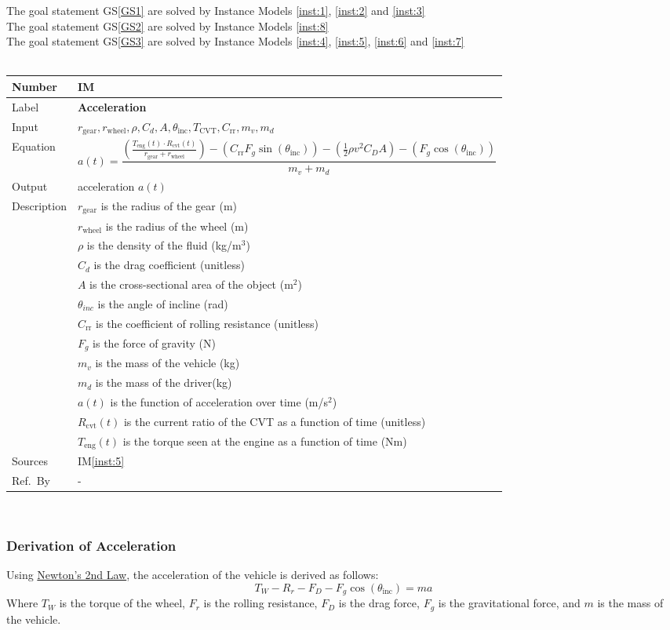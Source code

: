 \documentclass[12pt]{article}
\newcommand{\colAwidth}{0.13\textwidth}
\newcommand{\colBwidth}{0.82\textwidth}
\newcounter{instnum} %
\newcommand{\iref}[1]{IM\ref{#1}}
\newcommand{\definstance}[7] {
~\newline
\noindent
\begin{minipage}{\textwidth}
\renewcommand*{\arraystretch}{1.5}
\begin{tabular}{| p{\colAwidth} | p{\colBwidth}|}
  \hline
  \rowcolor[gray]{0.9}
  Number& IM\refstepcounter{instnum}\theinstnum \label{inst:\theinstnum}\\
  \hline
  Label& \bf #1 \\
  \hline
  Input& #2\\
  \hline
  Equation& #3\\
  \hline
  Output& #4\\
  \hline
  Description& #5 \\
  \hline
  Sources& #6 \\
  \hline
  Ref.\ By & #7\\
  \hline
\end{tabular}
\end{minipage}\\
}
\begin{document}
{\noindent}The goal statement GS\ref{GS1} are solved by Instance Models \ref{inst:1}, \ref{inst:2} and \ref{inst:3}\\
{\noindent}The goal statement GS\ref{GS2} are solved by Instance Models \ref{inst:8}\\
The goal statement GS\ref{GS3} are solved by Instance Models \ref{inst:4}, \ref{inst:5}, \ref{inst:6} and \ref{inst:7}\\
  \definstance
  {Acceleration}
  {$r_{\text{gear}}, r_{\text{wheel}}, \rho, C_d, A, \theta_{\text{inc}}, T_{\text{CVT}}, C_{\text{rr}}, m_v, m_d$}
  {
    \[ a(t) = \frac{\left( \frac{T_{\text{eng}}(t) \cdot R_\text{cvt}(t)}{r_{\text{gear}} + r_{\text{wheel}}} \right) - (C_{\text{rr}} F_g \sin(\theta_\text{inc})) - \left( \frac{1}{2} \rho v^2 C_D A \right) - (F_g \cos(\theta_\text{inc}))}{m_v + m_d} \]
    }
  {acceleration $a(t)$}
  {
  $r_{\text{gear}}$ is the radius of the gear (m)\\
  & $r_{\text{wheel}}$ is the radius of the wheel (m)\\
  & $\rho$ is the density of the fluid (kg/m$^3$)\\
  & $C_d$ is the drag coefficient (unitless)\\
  & $A$ is the cross-sectional area of the object (m$^2$)\\
  & $\theta_{inc}$ is the angle of incline (rad)\\
  & $C_{\text{rr}}$ is the coefficient of rolling resistance (unitless)\\
  & $F_g$ is the force of gravity (N)\\
  & $m_v$ is the mass of the vehicle (kg)\\
  & $m_d$ is the mass of the driver(kg)\\
  & $a(t)$ is the function of acceleration over time (m/s$^2$)\\
  & $R_\text{cvt}(t)$ is the current ratio of the CVT as a function of time (unitless)\\
  & $T_{\text{eng}}(t)$ is the torque seen at the engine as a function of time (Nm)
}
  {\iref{inst:5}}
  {-}
  
  
  \subsubsection*{Derivation of Acceleration}

Using \hyperref[TM:N2]{Newton's 2nd Law}, the acceleration of the vehicle is derived as follows: 
\[
T_W - R_r - F_D - F_g \cos(\theta_\text{inc}) = ma
\]
Where \( T_W \) is the torque of the wheel, \( F_r \) is the rolling resistance, \( F_D \) is the drag force, \( F_g \) is the gravitational force, and \( m \) is the mass of the vehicle. 
\end{document}

